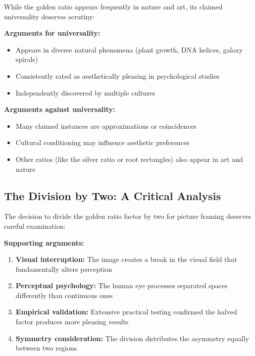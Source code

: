 \documentclass[12pt,a4paper]{article}
\begin{document}
While the golden ratio appears frequently in nature and art, its claimed universality deserves scrutiny:

\textbf{Arguments for universality:}

\begin{itemize}
    \item Appears in diverse natural phenomena (plant growth, DNA helices, galaxy spirals)
    \item Consistently rated as aesthetically pleasing in psychological studies
    \item Independently discovered by multiple cultures
\end{itemize}

\textbf{Arguments against universality:}

\begin{itemize}
    \item Many claimed instances are approximations or coincidences
    \item Cultural conditioning may influence aesthetic preferences
    \item Other ratios (like the silver ratio or root rectangles) also appear in art and nature
\end{itemize}

\subsection{The Division by Two: A Critical Analysis}

The decision to divide the golden ratio factor by two for picture framing deserves careful examination:

\textbf{Supporting arguments:}

\begin{enumerate}
    \item \textbf{Visual interruption:} The image creates a break in the visual field that fundamentally alters perception

    \item \textbf{Perceptual psychology:} The human eye processes separated spaces differently than continuous ones

    \item \textbf{Empirical validation:} Extensive practical testing confirmed the halved factor produces more pleasing results

    \item \textbf{Symmetry consideration:} The division distributes the asymmetry equally between two regions
\end{enumerate}
\end{document}
